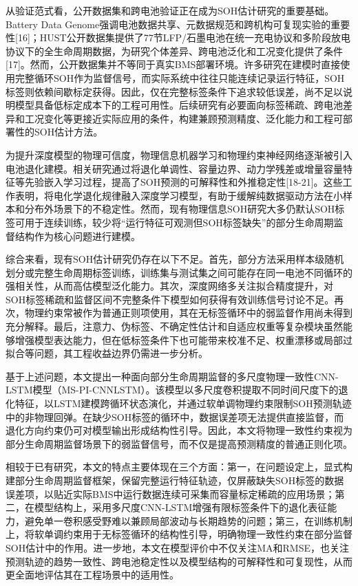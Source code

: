 \documentclass[12pt, a4paper]{ctexart}
\begin{document}
从验证范式看，公开数据集和跨电池验证正在成为SOH估计研究的重要基础。Battery Data Genome强调电池数据共享、元数据规范和跨机构可复现实验的重要性[16]；HUST公开数据集提供了77节LFP/石墨电池在统一充电协议和多阶段放电协议下的全生命周期数据，为研究个体差异、跨电池泛化和工况变化提供了条件[17]。然而，公开数据集并不等同于真实BMS部署环境。许多研究在建模时直接使用完整循环SOH作为监督信号，而实际系统中往往只能连续记录运行特征，SOH标签则依赖间歇标定获得。因此，仅在完整标签条件下追求较低误差，尚不足以说明模型具备低标定成本下的工程可用性。后续研究有必要面向标签稀疏、跨电池差异和工况变化等更接近实际应用的条件，构建兼顾预测精度、泛化能力和工程可部署性的SOH估计方法。


为提升深度模型的物理可信度，物理信息机器学习和物理约束神经网络逐渐被引入电池退化建模。相关研究通过将退化单调性、容量边界、动力学残差或增量容量特征等先验嵌入学习过程，提高了SOH预测的可解释性和外推稳定性[18-21]。这些工作表明，将电化学退化规律融入深度学习模型，有助于缓解纯数据驱动方法在小样本和分布外场景下的不稳定性。然而，现有物理信息SOH研究大多仍默认SOH标签可用于连续训练，较少将“运行特征可观测但SOH标签缺失”的部分生命周期监督结构作为核心问题进行建模。


综合来看，现有SOH估计研究仍存在以下不足。首先，部分方法采用样本级随机划分或完整生命周期标签训练，训练集与测试集之间可能存在同一电池不同循环的强相关性，从而高估模型泛化能力。其次，深度网络多关注拟合精度提升，对SOH标签稀疏和监督区间不完整条件下模型如何获得有效训练信号讨论不足。再次，物理约束常被作为普通正则项使用，其在无标签循环中的弱监督作用尚未得到充分解释。最后，注意力、伪标签、不确定性估计和自适应权重等复杂模块虽然能够增强模型表达能力，但在低标签条件下也可能带来校准不足、权重漂移或局部过拟合等问题，其工程收益边界仍需进一步分析。


基于上述问题，本文提出一种面向部分生命周期监督的多尺度物理一致性CNN-LSTM模型（MS-PI-CNNLSTM）。该模型以多尺度卷积提取不同时间尺度下的退化特征，以LSTM建模跨循环状态演化，并通过软单调物理约束限制SOH预测轨迹中的非物理回弹。在缺少SOH标签的循环中，数据误差项无法提供直接监督，而退化方向约束仍可对模型输出形成结构性引导。因此，本文将物理一致性约束视为部分生命周期监督场景下的弱监督信号，而不仅是提高预测精度的普通正则化项。


相较于已有研究，本文的特点主要体现在三个方面：第一，在问题设定上，显式构建部分生命周期监督框架，保留完整运行特征轨迹，仅屏蔽缺失SOH标签的数据误差项，以贴近实际BMS中运行数据连续可采集而容量标定稀疏的应用场景；第二，在模型结构上，采用多尺度CNN-LSTM增强有限标签条件下的退化表征能力，避免单一卷积感受野难以兼顾局部波动与长期趋势的问题；第三，在训练机制上，将软单调约束用于无标签循环的结构性引导，明确物理一致性约束在部分监督SOH估计中的作用。进一步地，本文在模型评价中不仅关注MA和RMSE，也关注预测轨迹的趋势一致性、跨电池稳定性以及模型结构的可解释性和可复现性，从而更全面地评估其在工程场景中的适用性。
\end{document}
